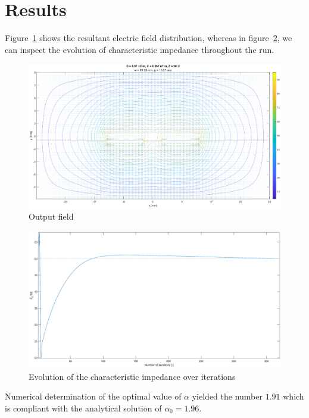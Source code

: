\documentclass[11pt,a4paper]{article}
\begin{document}
\section{Results}
Figure~\ref{fig:output-field} shows the resultant electric field distribution, whereas in figure~\ref{fig:output-z0-alpha17}, we can inspect the evolution of characteristic impedance throughout the run.
\begin{figure}[!ht]
    \centering
    \includegraphics[width=\textwidth]{src/output_field_alpha1-7.eps}
    \caption{Output field}
    \label{fig:output-field}
\end{figure}
\begin{figure}[!ht]
    \centering
    \includegraphics[width=\textwidth]{src/output_z0_alpha1-7.eps}
    \caption{Evolution of the characteristic impedance over iterations}
    \label{fig:output-z0-alpha17}
\end{figure}

Numerical determination of the optimal value of $\alpha$ yielded the number $1.91$ which is compliant with the analytical solution of $\alpha_0 = 1.96$.
\end{document}
